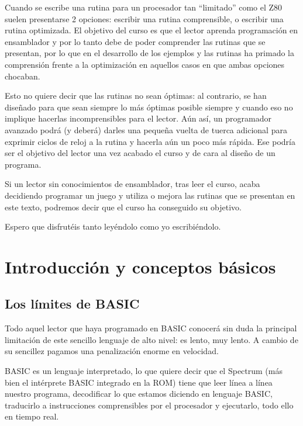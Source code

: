 \documentclass[letterpaper,10pt,spanish]{sphinxmanual}
\begin{document}
Cuando se escribe una rutina para un procesador tan “limitado” como el Z80 suelen presentarse 2 opciones: escribir una rutina comprensible, o escribir una rutina optimizada. El objetivo del curso es que el lector aprenda programación en ensamblador y por lo tanto debe de poder comprender las rutinas que se presentan, por lo que en el desarrollo de los ejemplos y las rutinas ha primado la comprensión frente a la optimización en aquellos casos en que ambas opciones chocaban.

Esto no quiere decir que las rutinas no sean óptimas: al contrario, se han diseñado para que sean siempre lo más óptimas posible siempre y cuando eso no implique hacerlas incomprensibles para el lector. Aún así, un programador avanzado podrá (y deberá) darles una pequeña vuelta de tuerca adicional para exprimir ciclos de reloj a la rutina y hacerla aún un poco más rápida. Ese podría ser el objetivo del lector una vez acabado el curso y de cara al diseño de un programa.

Si un lector sin conocimientos de ensamblador, tras leer el curso, acaba decidiendo programar un juego y utiliza o mejora las rutinas que se presentan en este texto, podremos decir que el curso ha conseguido su objetivo.

Espero que disfrutéis tanto leyéndolo como yo escribiéndolo.


\chapter{Introducción y conceptos básicos}
\label{\detokenize{02_introduccion/introduccion:introduccion-y-conceptos-basicos}}\label{\detokenize{02_introduccion/introduccion::doc}}

\section{Los límites de BASIC}
\label{\detokenize{02_introduccion/introduccion:los-limites-de-basic}}
Todo aquel lector que haya programado en BASIC conocerá sin duda la principal limitación de este sencillo lenguaje de alto nivel: es lento, muy lento. A cambio de su sencillez pagamos una penalización enorme en velocidad.

BASIC es un lenguaje interpretado, lo que quiere decir que el Spectrum (más bien el intérprete BASIC integrado en la ROM) tiene que leer línea a línea nuestro programa, decodificar lo que estamos diciendo en lenguaje BASIC, traducirlo a instrucciones comprensibles por el procesador y ejecutarlo, todo ello en tiempo real.
\end{document}

